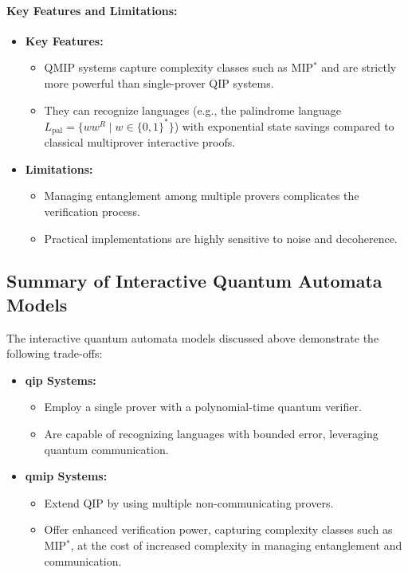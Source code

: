 \paragraph{Key Features and Limitations:}
\begin{itemize}
    \item \textbf{Key Features:}
    \begin{itemize}
        \item QMIP systems capture complexity classes such as MIP\(^*\) and are strictly more powerful than single-prover QIP systems.
        \item They can recognize languages (e.g., the palindrome language \( L_{\text{pal}} = \{ww^R \mid w \in \{0,1\}^*\} \)) with exponential state savings compared to classical multiprover interactive proofs.
    \end{itemize}
    \item \textbf{Limitations:}
    \begin{itemize}
        \item Managing entanglement among multiple provers complicates the verification process.
        \item Practical implementations are highly sensitive to noise and decoherence.
    \end{itemize}
\end{itemize}

\subsection*{Summary of Interactive Quantum Automata Models}
The interactive quantum automata models discussed above demonstrate the following trade-offs:
\begin{itemize}
    \item \textbf{\gls{qip} Systems:}  
    \begin{itemize}
        \item Employ a single prover with a polynomial-time quantum verifier.
        \item Are capable of recognizing languages with bounded error, leveraging quantum communication.
    \end{itemize}
    \item \textbf{\gls{qmip} Systems:}  
    \begin{itemize}
        \item Extend QIP by using multiple non-communicating provers.
        \item Offer enhanced verification power, capturing complexity classes such as MIP\(^*\), at the cost of increased complexity in managing entanglement and communication.
    \end{itemize}
\end{itemize}

